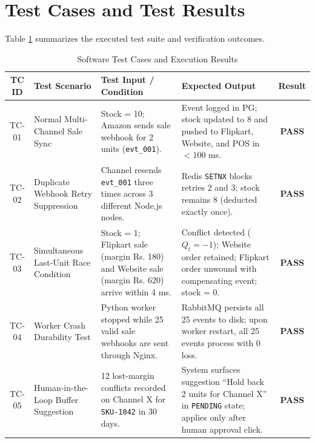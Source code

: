 \documentclass[oneside,a4paper,12pt]{report}
\begin{document}
\section{Test Cases and Test Results}
Table \ref{tab:testcases} summarizes the executed test suite and verification outcomes.

\begin{table}[!htbp]
\centering
\footnotesize
\renewcommand{\arraystretch}{1.35}
\begin{tabularx}{\textwidth}{|c|p{2.6cm}|X|X|c|}
\hline
\textbf{TC ID} & \textbf{Test Scenario} & \textbf{Test Input / Condition} & \textbf{Expected Output} & \textbf{Result} \\ \hline
TC-01 & Normal Multi-Channel Sale Sync & Stock = 10; Amazon sends sale webhook for 2 units (\texttt{evt\_001}). & Event logged in PG; stock updated to 8 and pushed to Flipkart, Website, and POS in $<100$ ms. & \textbf{PASS} \\ \hline
TC-02 & Duplicate Webhook Retry Suppression & Channel resends \texttt{evt\_001} three times across 3 different Node.js nodes. & Redis \texttt{SETNX} blocks retries 2 and 3; stock remains 8 (deducted exactly once). & \textbf{PASS} \\ \hline
TC-03 & Simultaneous Last-Unit Race Condition & Stock = 1; Flipkart sale (margin Rs. 180) and Website sale (margin Rs. 620) arrive within 4 ms. & Conflict detected ($Q_t = -1$); Website order retained; Flipkart order unwound with compensating event; stock = 0. & \textbf{PASS} \\ \hline
TC-04 & Worker Crash Durability Test & Python worker stopped while 25 valid sale webhooks are sent through Nginx. & RabbitMQ persists all 25 events to disk; upon worker restart, all 25 events process with 0 loss. & \textbf{PASS} \\ \hline
TC-05 & Human-in-the-Loop Buffer Suggestion & 12 lost-margin conflicts recorded on Channel X for \texttt{SKU-1042} in 30 days. & System surfaces suggestion ``Hold back 2 units for Channel X'' in \texttt{PENDING} state; applies only after human approval click. & \textbf{PASS} \\ \hline
\end{tabularx}
\caption{Software Test Cases and Execution Results}
\label{tab:testcases}
\end{table}

\end{document}
